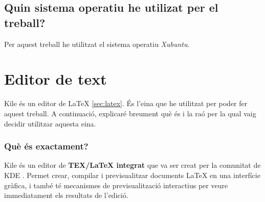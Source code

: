 \subsection{Quin sistema operatiu he utilizat per el treball?}
Per aquest treball he utilitzat el sistema operatiu \textit{Xubuntu}\cite{xubuntu}.

\section{Editor de text} \label{sec:Kile}

%
%
Kile \cite{kile} és un editor de LaTeX \ref{sec:latex}. És l’eina que he utilitzat per poder fer aquest treball. A continuació, explicaré breument què és i la raó per la qual vaig decidir utilitzar aquesta eina.


\subsubsection{Què és exactament?}
Kile és un editor de \textbf{TEX/LaTeX integrat} que va ser creat per la comunitat de KDE \cite{kile}. Permet crear, compilar i previsualitzar documents LaTeX en una interfície gràfica, i també té mecanismes de previsualització interactius per veure immediatament els resultats de l’edició.

